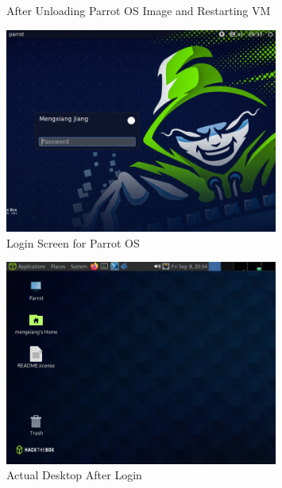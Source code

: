 \documentclass[12pt]{article}
\newenvironment{problem}[2][Problem]{\begin{trivlist}
\item[\hskip \labelsep {\bfseries #1}\hskip \labelsep {\bfseries #2.}]}{\end{trivlist}}
\begin{document}
\begin{problem}{1}
\begin{figure}[H]
        \caption{After Unloading Parrot OS Image and Restarting VM}
    \end{figure}
    \begin{figure}[H]
        \centering
        \includegraphics[width=0.8\textwidth]{parrot2}
        \caption{Login Screen for Parrot OS}
    \end{figure}
    \begin{figure}[H]
        \centering
        \includegraphics[width=0.8\textwidth]{parrot3}
        \caption{Actual Desktop After Login}
    \end{figure}


\end{problem}
 
\end{document}
